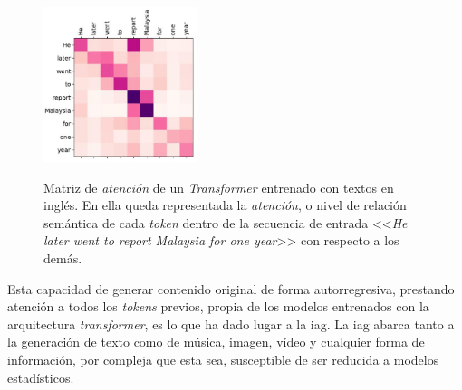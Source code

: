 \begin{figure}[H]
    \caption[Matriz de \emph{atención} de un \emph{Transformer} entrenado con textos en inglés]{Matriz de \emph{atención} de un \emph{Transformer} entrenado con textos en inglés. En ella queda representada la \emph{atención}, o nivel de relación semántica de cada \emph{token} dentro de la secuencia de entrada <<\emph{He later went to report Malaysia for one year}>> con respecto a los demás.}
    \centering
    \includegraphics[width=0.4\textwidth]{./figuras/Transformer_attention_matrix.png}
    \label{fig:transformer_attention}
\end{figure}

Esta capacidad de generar contenido original de forma autorregresiva, prestando atención a todos los \emph{tokens} previos, propia de los modelos entrenados con la arquitectura \emph{transformer}, es lo que ha dado lugar a la \gls{iag}. La \gls{iag} abarca tanto a la generación de texto como de música, imagen, vídeo y cualquier forma de información, por compleja que esta sea, susceptible de ser reducida a modelos estadísticos.